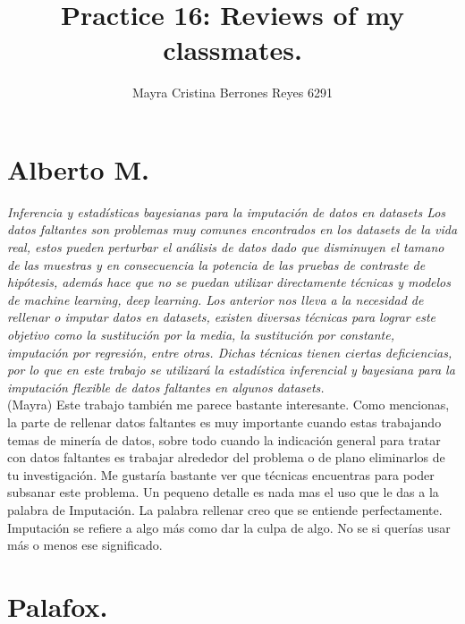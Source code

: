 \documentclass{article}
\begin{document}
\title{%
  Practice 16: Reviews of my classmates. } %
\author{Mayra Cristina Berrones Reyes 6291}

\maketitle

\section{Alberto M.}

\textit{Inferencia y estad\'isticas bayesianas para la imputaci\'on de datos en datasets
Los datos faltantes son problemas muy comunes encontrados en los datasets de la vida real, estos pueden perturbar el an\'alisis de datos dado que disminuyen el tamano de las muestras y en consecuencia la potencia de las pruebas de contraste de hip\'otesis, adem\'as hace que no se puedan utilizar directamente t\'ecnicas y modelos de machine learning, deep learning. Los anterior nos lleva a la necesidad de rellenar o imputar datos en \textit{datasets}, existen diversas t\'ecnicas para lograr este objetivo como la sustituci\'on por la media, la sustituci\'on por constante, imputaci\'on por regresi\'on, entre otras. Dichas t\'ecnicas tienen ciertas deficiencias, por lo que en este trabajo se utilizar\'a la estad\'istica inferencial y bayesiana para la imputaci\'on flexible de datos faltantes en algunos datasets.} \\


(Mayra) Este trabajo tambi\'en me parece bastante interesante. Como mencionas, la parte de rellenar datos faltantes es muy importante cuando estas trabajando temas de miner\'ia de datos, sobre todo cuando la indicaci\'on general para tratar con datos faltantes es trabajar alrededor del problema o de plano eliminarlos de tu investigaci\'on. Me gustaría bastante ver que t\'ecnicas encuentras para poder subsanar este problema. Un pequeno detalle es nada mas el uso que le das a la palabra de Imputaci\'on. La palabra rellenar creo que se entiende perfectamente. Imputaci\'on se refiere a algo m\'as como dar la culpa de algo. No se si quer\'ias usar m\'as o menos ese significado. \\

\section{Palafox.}
\end{document}
